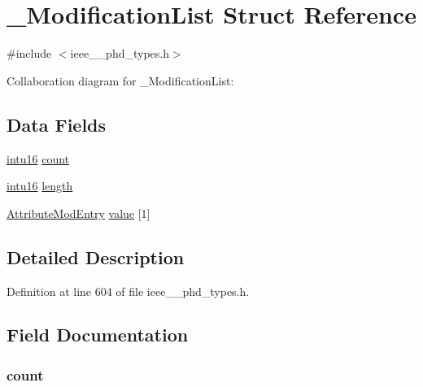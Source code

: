 \hypertarget{struct___modification_list}{}\section{\+\_\+\+Modification\+List Struct Reference}
\label{struct___modification_list}


{\ttfamily \#include $<$ieee\+\_\+\_\+phd\+\_\+types.\+h$>$}



Collaboration diagram for \+\_\+\+Modification\+List\+:
\subsection*{Data Fields}
\begin{DoxyCompactItemize}
\item 
\hyperlink{ieee__11073__phd__types_8h_a3561595d2aa7416532e1c9910abd076d}{intu16} \hyperlink{struct___modification_list_abf6db060ae8e224764b0f867fb135ecd}{count}
\item 
\hyperlink{ieee__11073__phd__types_8h_a3561595d2aa7416532e1c9910abd076d}{intu16} \hyperlink{struct___modification_list_a3743679e4ff85e3e1b3fc2e59973fbb3}{length}
\item 
\hyperlink{ieee__11073__phd__types_8h_a09d21defb379625b6e23997b7a0a65a8}{Attribute\+Mod\+Entry} \hyperlink{struct___modification_list_ac9a276cfbe21a876363c5aaca6cf323f}{value} \mbox{[}1\mbox{]}
\end{DoxyCompactItemize}


\subsection{Detailed Description}


Definition at line 604 of file ieee\+\_\+\_\+phd\+\_\+types.\+h.



\subsection{Field Documentation}
\hypertarget{struct___modification_list_abf6db060ae8e224764b0f867fb135ecd}{}
\subsubsection[{count}]{ count}\label{struct___modification_list_abf6db060ae8e224764b0f867fb135ecd}


